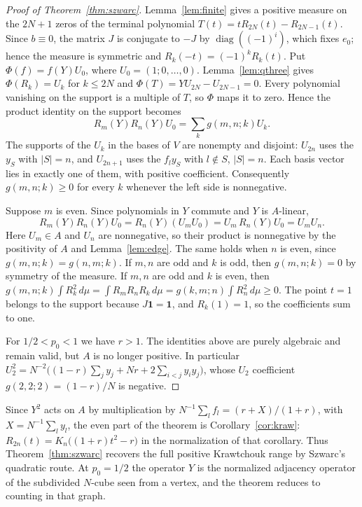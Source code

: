\documentclass[twoside,10pt]{article}
\numberwithin{equation}{section}
\theoremstyle{slbody}
\theoremstyle{definition}
\theoremstyle{remark}
\begin{document}
\begin{proof}[Proof of Theorem~\ref{thm:szwarc}]
Lemma~\ref{lem:finite} gives a positive measure on the $2N+1$ zeros of the terminal polynomial $T(t)=tR_{2N}(t)-R_{2N-1}(t)$. Since $b\equiv0$, the matrix $J$ is conjugate to $-J$ by $\operatorname{diag}((-1)^i)$, which fixes $e_0$; hence the measure is symmetric and $R_k(-t)=(-1)^kR_k(t)$. Put $\Phi(f)=f(Y)U_0$, where $U_0=(1;0,\ldots,0)$. Lemma~\ref{lem:qthree} gives $\Phi(R_k)=U_k$ for $k\leq2N$ and $\Phi(T)=YU_{2N}-U_{2N-1}=0$. Every polynomial vanishing on the support is a multiple of $T$, so $\Phi$ maps it to zero. Hence the product identity on the support becomes
\[
R_m(Y)R_n(Y)U_0=\sum_kg(m,n;k)U_k.
\]
The supports of the $U_k$ in the bases of $V$ are nonempty and disjoint: $U_{2n}$ uses the $y_S$ with $|S|=n$, and $U_{2n+1}$ uses the $f_ly_S$ with $l\notin S$, $|S|=n$. Each basis vector lies in exactly one of them, with positive coefficient. Consequently $g(m,n;k)\geq0$ for every $k$ whenever the left side is nonnegative.

Suppose $m$ is even. Since polynomials in $Y$ commute and $Y$ is $A$-linear,
\[
R_m(Y)R_n(Y)U_0=R_n(Y)(U_mU_0)=U_m\,R_n(Y)U_0=U_mU_n.
\]
Here $U_m\in A$ and $U_n$ are nonnegative, so their product is nonnegative by the positivity of $A$ and Lemma~\ref{lem:edge}. The same holds when $n$ is even, since $g(m,n;k)=g(n,m;k)$. If $m,n$ are odd and $k$ is odd, then $g(m,n;k)=0$ by symmetry of the measure. If $m,n$ are odd and $k$ is even, then $g(m,n;k)\int R_k^2\,d\mu=\int R_mR_nR_k\,d\mu=g(k,m;n)\int R_n^2\,d\mu\geq0$. The point $t=1$ belongs to the support because $J\boldsymbol1=\boldsymbol1$, and $R_k(1)=1$, so the coefficients sum to one.

For $1/2<p_0<1$ we have $r>1$. The identities above are purely algebraic and remain valid, but $A$ is no longer positive. In particular $U_2^2=N^{-2}\big((1-r)\sum_jy_j+Nr+2\sum_{i<j}y_iy_j\big)$, whose $U_2$ coefficient $g(2,2;2)=(1-r)/N$ is negative.
\end{proof}

Since $Y^2$ acts on $A$ by multiplication by $N^{-1}\sum_lf_l=(r+X)/(1+r)$, with $X=N^{-1}\sum_ly_l$, the even part of the theorem is Corollary~\ref{cor:kraw}: $R_{2n}(t)=K_n\big((1+r)t^2-r\big)$ in the normalization of that corollary. Thus Theorem~\ref{thm:szwarc} recovers the full positive Krawtchouk range by Szwarc's quadratic route. At $p_0=1/2$ the operator $Y$ is the normalized adjacency operator of the subdivided $N$-cube seen from a vertex, and the theorem reduces to counting in that graph.
\end{document}
